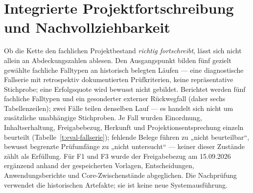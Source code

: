 
\section{Integrierte Projektfortschreibung und Nachvollziehbarkeit}
\label{sec:eval-fortschreibung}

Ob die Kette den fachlichen Projektbestand \emph{richtig fortschreibt}, lässt
sich nicht allein an Abdeckungszahlen ablesen. Den Ausgangspunkt
bilden fünf gezielt gewählte fachliche Falltypen an
historisch belegten Läufen --- eine diagnostische Fallserie mit
retrospektiv dokumentierten Prüfkriterien, keine repräsentative
Stichprobe; eine Erfolgsquote wird bewusst nicht gebildet. Berichtet
werden fünf fachliche Falltypen und ein gesonderter externer
Rückwegfall (daher sechs Tabellenzeilen); zwei Fälle teilen
denselben Lauf --- es handelt sich nicht um zusätzliche
unabhängige Stichproben. Je Fall
wurden Einordnung, Inhaltserhaltung, Freigabebezug, Herkunft und
Projektionsentsprechung einzeln beurteilt
(Tabelle~\ref{t:eval-fallserie}); fehlende Belege führen zu
„nicht beurteilbar``, bewusst begrenzte Prüfumfänge zu „nicht
untersucht`` --- keiner dieser Zustände zählt als Erfüllung.
Für F1 und F3 wurde der Freigabebezug am 15.09.2026 ergänzend
anhand der gespeicherten Vorlagen, Entscheidungen, Anwendungsberichte
und Core-Zwischenstände abgeglichen. Die Nachprüfung verwendet die
historischen Artefakte; sie ist keine neue Systemausführung.

